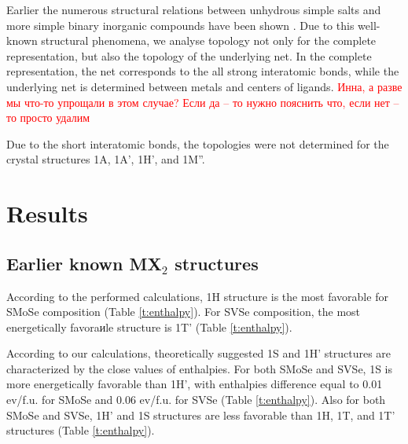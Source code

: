 \documentclass[a4paperm]{article}
\begin{document}
Earlier the numerous structural relations between unhydrous simple salts and more simple binary inorganic compounds have been shown \cite{blatov2011_salts, medrish2020_zintl}. 
Due to this well-known structural phenomena, we analyse topology not only for the complete  representation, but also the topology of the underlying net.
In the complete representation, the net corresponds to the all strong interatomic bonds, while the underlying net is determined between metals and centers of ligands.
\textcolor{red}{Инна, а разве мы что-то упрощали в этом случае? Если да -- то нужно пояснить что, если нет -- то просто удалим}

Due to the short interatomic bonds, the topologies were not determined for the crystal structures 1A, 1A', 1H', and  1M''.


			\section{Results}

\subsection*{Earlier known MX$_2$ structures}

According to the performed calculations, 1H structure is the most favorable for SMoSe composition  (Table \ref{t:enthalpy}).
For SVSe composition, the most energetically favoraиle structure is 1T' (Table \ref{t:enthalpy}). 

According to our calculations, theoretically suggested 1S and 1H' \cite{tang2021_janus,ma2016_fxt} structures are characterized by the close values of enthalpies.
For both SMoSe and SVSe, 1S is more energetically favorable than 1H', with enthalpies difference equal to 0.01 ev/f.u. for SMoSe and 0.06 ev/f.u. for SVSe (Table \ref{t:enthalpy}).
Also for both SMoSe and SVSe, 1H' and 1S structures are less favorable than 1H, 1T, and 1T' structures (Table \ref{t:enthalpy}).
\end{document}
